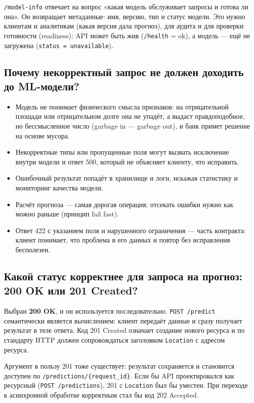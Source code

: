 \documentclass[12pt,a4paper]{article}
\begin{document}
\texttt{/model-info} отвечает на вопрос «какая модель обслуживает запросы и готова ли она». Он возвращает метаданные: имя, версию, тип и статус модели. Это нужно клиентам и аналитикам (какая версия дала прогноз), для аудита и для проверки готовности (readiness): API может быть жив (\texttt{/health} = ok), а модель --- ещё не загружена (\texttt{status = unavailable}).

\subsection{Почему некорректный запрос не должен доходить до ML-модели?}

\begin{itemize}
    \item Модель не понимает физического смысла признаков: на отрицательной площади или отрицательном долге она не упадёт, а выдаст правдоподобное, но бессмысленное число (garbage in --- garbage out), и банк примет решение на основе мусора.
    \item Некорректные типы или пропущенные поля могут вызвать исключение внутри модели и ответ 500, который не объясняет клиенту, что исправить.
    \item Ошибочный результат попадёт в хранилище и логи, искажая статистику и мониторинг качества модели.
    \item Расчёт прогноза --- самая дорогая операция; отсекать ошибки нужно как можно раньше (принцип fail fast).
    \item Ответ 422 с указанием поля и нарушенного ограничения --- часть контракта: клиент понимает, что проблема в его данных и повтор без исправления бесполезен.
\end{itemize}

\subsection{Какой статус корректнее для запроса на прогноз: 200 OK или 201 Created?}

Выбран \textbf{200 OK}, и он используется последовательно. \texttt{POST /predict} семантически является вычислением: клиент передаёт данные и сразу получает результат в теле ответа. Код 201 Created означает создание нового ресурса и по стандарту HTTP должен сопровождаться заголовком \texttt{Location} с адресом ресурса.

Аргумент в пользу 201 тоже существует: результат сохраняется и становится доступен по \texttt{/predictions/\{request\_id\}}. Если бы API проектировался как ресурсный (\texttt{POST /predictions}), 201 с \texttt{Location} был бы уместен. При переходе к асинхронной обработке корректным стал бы код 202 Accepted.
\end{document}

